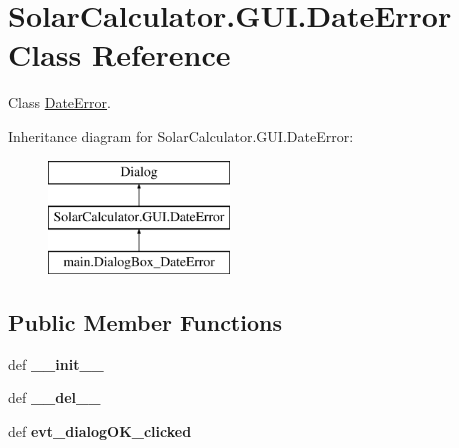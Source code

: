 \hypertarget{class_solar_calculator_1_1_g_u_i_1_1_date_error}{\section{Solar\-Calculator.\-G\-U\-I.\-Date\-Error Class Reference}
\label{class_solar_calculator_1_1_g_u_i_1_1_date_error}
}


Class \hyperlink{class_solar_calculator_1_1_g_u_i_1_1_date_error}{Date\-Error}.  


Inheritance diagram for Solar\-Calculator.\-G\-U\-I.\-Date\-Error\-:\begin{figure}[H]
\begin{center}
\leavevmode
\includegraphics[height=3.000000cm]{class_solar_calculator_1_1_g_u_i_1_1_date_error}
\end{center}
\end{figure}
\subsection*{Public Member Functions}
\begin{DoxyCompactItemize}
\item 
\hypertarget{class_solar_calculator_1_1_g_u_i_1_1_date_error_a61f8b62d0ac7a29a5edc48d3d74f22e4}{def {\bfseries \-\_\-\-\_\-init\-\_\-\-\_\-}}\label{class_solar_calculator_1_1_g_u_i_1_1_date_error_a61f8b62d0ac7a29a5edc48d3d74f22e4}

\item 
\hypertarget{class_solar_calculator_1_1_g_u_i_1_1_date_error_a939b72fbbf957008b1333d7162ad0b23}{def {\bfseries \-\_\-\-\_\-del\-\_\-\-\_\-}}\label{class_solar_calculator_1_1_g_u_i_1_1_date_error_a939b72fbbf957008b1333d7162ad0b23}

\item 
\hypertarget{class_solar_calculator_1_1_g_u_i_1_1_date_error_ac488db6f23dec1cfaddf7e5067b68654}{def {\bfseries evt\-\_\-dialog\-O\-K\-\_\-clicked}}\label{class_solar_calculator_1_1_g_u_i_1_1_date_error_ac488db6f23dec1cfaddf7e5067b68654}

\end{DoxyCompactItemize}
